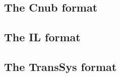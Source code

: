 



\subsection{The \textbf{Cnub} format}

\subsection{The \textbf{IL} format}

\subsection{The \textbf{TransSys} format}




